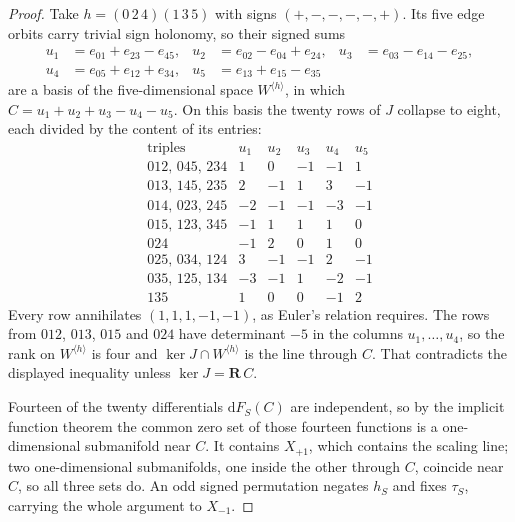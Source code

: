 \begin{proof}
Take \(h=(0\,2\,4)(1\,3\,5)\) with signs \((+,-,-,-,-,+)\).  Its five edge
orbits carry trivial sign holonomy, so their signed sums
\[
\begin{aligned}
 u_1&=e_{01}+e_{23}-e_{45}, &
 u_2&=e_{02}-e_{04}+e_{24}, &
 u_3&=e_{03}-e_{14}-e_{25},\\
 u_4&=e_{05}+e_{12}+e_{34}, &
 u_5&=e_{13}+e_{15}-e_{35} &&
\end{aligned}
\]
are a basis of the five-dimensional space \(W^{\langle h\rangle}\), in which
\(C=u_1+u_2+u_3-u_4-u_5\).  On this basis the twenty rows of \(J\) collapse to
eight, each divided by the content of its entries:
\begin{equation}
\label{tab:reduced-jacobian}
\begin{array}{c|rrrrr}
 \text{triples} & u_1 & u_2 & u_3 & u_4 & u_5\\\hline
 012,\,045,\,234 &  1 &  0 & -1 & -1 &  1\\
 013,\,145,\,235 &  2 & -1 &  1 &  3 & -1\\
 014,\,023,\,245 & -2 & -1 & -1 & -3 & -1\\
 015,\,123,\,345 & -1 &  1 &  1 &  1 &  0\\
 024             & -1 &  2 &  0 &  1 &  0\\
 025,\,034,\,124 &  3 & -1 & -1 &  2 & -1\\
 035,\,125,\,134 & -3 & -1 &  1 & -2 & -1\\
 135             &  1 &  0 &  0 & -1 &  2
\end{array}
\end{equation}
Every row annihilates \((1,1,1,-1,-1)\), as Euler's relation requires.  The rows
from \(012\), \(013\), \(015\) and \(024\) have determinant \(-5\) in the columns
\(u_1,\dots,u_4\), so the rank on \(W^{\langle h\rangle}\) is four and
\(\ker J\cap W^{\langle h\rangle}\) is the line through \(C\).  That contradicts
the displayed inequality unless \(\ker J=\mathbf R\,C\).

Fourteen of the twenty differentials \(\mathrm dF_S(C)\) are independent, so
by the implicit function theorem the common zero set of those fourteen
functions is a one-dimensional submanifold near \(C\).  It contains
\(X_{+1}\), which contains the scaling line; two one-dimensional
submanifolds, one inside the other through \(C\), coincide near \(C\), so all
three sets do.  An odd signed permutation negates \(h_S\) and fixes
\(\tau_S\), carrying the whole argument to \(X_{-1}\).
\end{proof}

